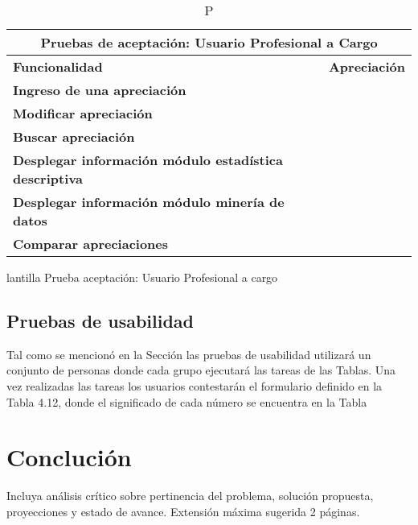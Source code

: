 \begin{table}[h]
	\centering
	\begin{tabular}{|l|l|}
		\hline
		\multicolumn{2}{|c|}{\textbf{Pruebas de aceptación: Usuario Profesional a Cargo}}    \\ \hline
		\textbf{Funcionalidad}                                        & \textbf{Apreciación} \\ \hline
		\textbf{Ingreso de una apreciación}                           &                      \\ \hline
		\textbf{Modificar apreciación}                                &                      \\ \hline
		\textbf{Buscar apreciación}                                   &                      \\ \hline
		\textbf{Desplegar información módulo estadística descriptiva} &                      \\ \hline
		\textbf{Desplegar información módulo minería de datos}        &                      \\ \hline
		\textbf{Comparar apreciaciones}                               &                      \\ \hline
	\end{tabular}
	\caption Plantilla Prueba aceptación: Usuario Profesional a cargo
\end{table}


\subsection{Pruebas de usabilidad}

Tal como se mencionó en la Sección las pruebas de usabilidad utilizará un conjunto de personas donde cada grupo ejecutará las tareas de las Tablas. Una vez realizadas las tareas los usuarios contestarán el formulario definido en la Tabla 4.12, donde el significado de cada número se encuentra en la Tabla\\




\section{Conclución}  \label{conclusiones}
Incluya análisis crítico sobre  pertinencia del problema, solución propuesta, proyecciones
y estado de avance. Extensión máxima sugerida 2 páginas.\\

\clearpage
\newpage

